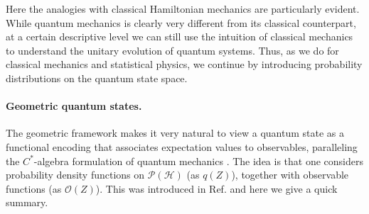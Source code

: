 \documentclass[draft,nofootinbib,pre,twocolumn,showpacs,showkeys,preprintnumbers,floatfix]{revtex4-1}
\newcommand{\1}{\mathbbm{1}}
\begin{document}
Here the analogies with classical Hamiltonian mechanics are particularly evident.
While quantum mechanics is clearly very different from its classical
counterpart, at a certain descriptive level we can still use the intuition
of classical mechanics to understand the unitary evolution of quantum
systems. Thus, as we do for classical mechanics and statistical physics, 
we continue by introducing probability distributions on the quantum state space.

\paragraph*{Geometric quantum states.}
The geometric framework makes it very natural to view a quantum state as a functional
encoding that associates expectation values to observables, paralleling the
$C^{*}$-algebra formulation of quantum mechanics \cite{Strocchi2008a}. 
The idea is that one considers probability density functions on $\mathcal{P}(\mathcal{H})$ (as $q(Z)$),
together with observable functions (as $\mathcal{O}(Z)$). This was introduced 
in Ref. \cite{Brody2001} and here we give a quick summary.
\end{document}
